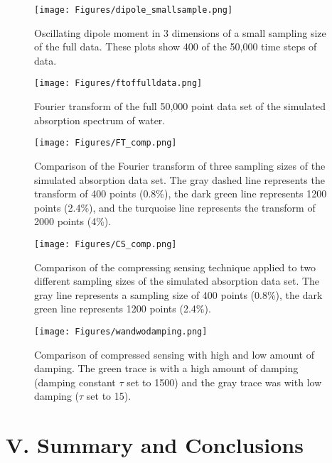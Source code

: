\documentclass[11pt]{article}
\begin{document}
\begin{figure}[H]
\texttt{[image: Figures/dipole\_smallsample.png]}
\caption{Oscillating dipole moment in 3 dimensions of a small sampling size of the full data. These plots show 400 of the 50,000 time steps of data.}
\label{fig:partdipole}
\end{figure}

\begin{figure}[H]
\texttt{[image: Figures/ftoffulldata.png]}
\caption{Fourier transform of the full 50,000 point data set of the simulated absorption spectrum of water.}
\label{fig:fullFT}
\end{figure}

\begin{figure}[H]
\texttt{[image: Figures/FT\_comp.png]}
\caption{Comparison of the Fourier transform of three sampling sizes of the simulated absorption data set. The gray dashed line represents the transform of 400 points (0.8\%), the dark green line represents 1200 points (2.4\%), and the turquoise line represents the transform of 2000 points (4\%).}
\label{fig:FTcomp}
\end{figure}

\begin{figure}[H]
\texttt{[image: Figures/CS\_comp.png]}
\caption{Comparison of the compressing sensing technique applied to two different sampling sizes of the simulated absorption data set. The gray line represents a sampling size of 400 points (0.8\%), the dark green line represents 1200 points (2.4\%).}
\label{fig:CScomp}
\end{figure}

\begin{figure}[H]
\texttt{[image: Figures/wandwodamping.png]}
\caption{Comparison of compressed sensing with high and low amount of damping. The green trace is with a high amount of damping (damping constant $\tau$ set to 1500) and the gray trace was with low damping ($\tau$ set to 15).}
\end{figure}

\pagebreak



\section*{V.	Summary and Conclusions} %
\end{document}
